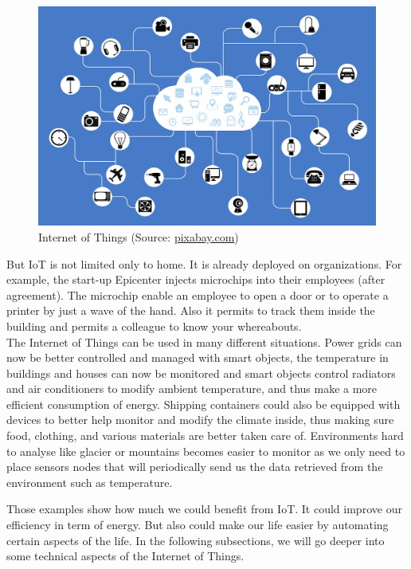 \begin{figure}
  \label{fig:iot}
  \centering
  \includegraphics[width=\textwidth]{res/iot.png}
  \caption{Internet of Things (Source: \url{pixabay.com})}
\end{figure}

But IoT is not limited only to home. It is already deployed on organizations. For example, the start-up Epicenter injects microchips into their employees (after agreement)\cite{website:lat_04_17}. The microchip enable an employee to open a door or to operate a printer by just a wave of the hand. Also it permits to track them inside the building and permits a colleague to know your whereabouts. \\

The Internet of Things can be used in many different situations. Power grids can now be better controlled and managed with smart objects, the temperature in buildings and houses can now be monitored and smart objects control radiators and air conditioners to modify ambient temperature, and thus make a more efficient consumption of energy. Shipping containers could also be equipped with devices to better help monitor and modify the climate inside, thus making sure food, clothing, and various materials are better taken care of. Environments hard to analyse like glacier or mountains becomes easier to monitor as we only need to place sensors nodes that will periodically send us the data retrieved from the environment such as temperature. \\


Those examples show how much we could benefit from IoT. It could improve our efficiency in term of energy. But also could make our life easier by automating certain aspects of the life. In the following subsections, we will go deeper into some technical aspects of the Internet of Things. \\

